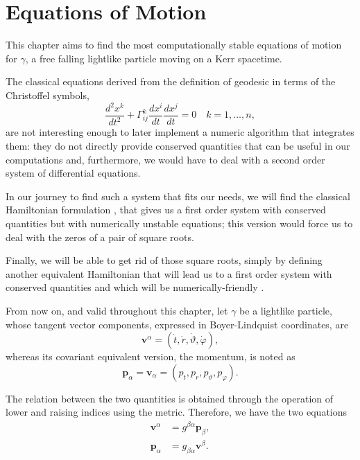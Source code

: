 \chapter{Equations of Motion}

This chapter aims to find the most computationally stable equations of motion for $\gamma$, a free falling lightlike particle moving on a Kerr spacetime.

The classical equations derived from the definition of geodesic in terms of the Christoffel symbols,
\[
	\frac{d^2x^k}{dt^2} + \Gamma^k_{ij} \frac{d x^i}{dt} \frac{d x^j}{dt} = 0 \quad k = 1, \dots, n,
\]
are not interesting enough to later implement a numeric algorithm that integrates them: they do not directly provide conserved quantities that can be useful in our computations and, furthermore, we would have to deal with a second order system of differential equations.

In our journey to find such a system that fits our needs, we will find the classical Hamiltonian formulation \cite[Sec. 33.5]{thorne73}, that gives us a first order system with conserved quantities but with numerically unstable equations; this version would force us to deal with the zeros of a pair of square roots.

Finally, we will be able to get rid of those square roots, simply by defining another equivalent Hamiltonian that will lead us to a first order system with conserved quantities and which will be numerically-friendly \cite{thorne15}.

From now on, and valid throughout this chapter, let $\gamma$ be a lightlike particle, whose tangent vector components, expressed in Boyer-Lindquist coordinates, are
\begin{equation}
	\label{eq:blcoord1}
	\mathbf{v}^\alpha = (\dot{t}, \dot{r}, \dot{\vartheta}, \dot{\varphi}),
\end{equation}
whereas its covariant equivalent version, the momentum, is noted as
\begin{equation}
	\label{eq:blcoord2}
	\mathbf{p}_\alpha = \mathbf{v}_\alpha = (p_t, p_r, p_\vartheta, p_\varphi).
\end{equation}

The relation between the two quantities is obtained through the operation of lower and raising indices using the metric. Therefore, we have the two equations
\begin{align}
	\label{eq:raisep}
	\mathbf{v}^\alpha &= g^{\beta\alpha} \mathbf{p}_\beta, \\
	\label{eq:lowerv}
	\mathbf{p}_\alpha &= g_{\beta\alpha} \mathbf{v}^\beta.
\end{align}

